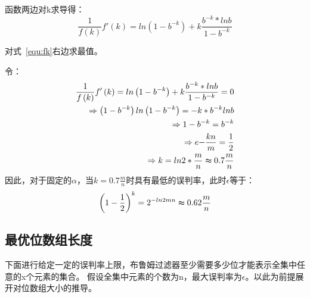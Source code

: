 函数两边对k求导得：
\begin{equation}
\frac{1}{f\left(k\right)} f'\left(k\right) = ln\left(1 - b^{-k}\right) + k \frac{b^{-k}\ast lnb}{1 - b^{-k}} 
\label{equ:fk}
\end{equation}

对式~\ref{equ:fk}右边求最值。

令：
\begin{equation}
\begin{split}
\frac{1}{f\left(k\right)}f'\left(k\right) = ln\left(1 - b^{-k}\right) + k \frac{b^{-k}\ast lnb}{1 - b^{-k}} = 0 \\
\Rightarrow \left(1 - b^{-k}\right) ln\left(1 - b^{-k}\right) = -k\ast b^{-k}lnb \\
\Rightarrow 1 - b^{-k} = b^{-k} \\
\Rightarrow e{-\frac{kn}{m}} = \frac{1}{2}\\
\Rightarrow k = ln2\ast \frac{m}{n} \thickapprox 0.7\frac{m}{n}
\end{split}
\end{equation}
因此，对于固定的\begin{math}\alpha\end{math}，当\begin{math}k = 0.7\frac{m}{n}\end{math}时具有最低的误判率，此时\begin{math}\epsilon\end{math}等于：
\begin{equation}
\left(1 - \frac{1}{2}\right)^k = 2^{-ln2{m}{n}} \thickapprox 0.62\frac{m}{n}
\end{equation}

\subsection{最优位数组长度}
下面进行给定一定的误判率上限，布鲁姆过滤器至少需要多少位才能表示全集中任意的x个元素的集合。
假设全集中元素的个数为n，最大误判率为\begin{math}\epsilon\end{math}。以此为前提展开对位数组大小的推导。

